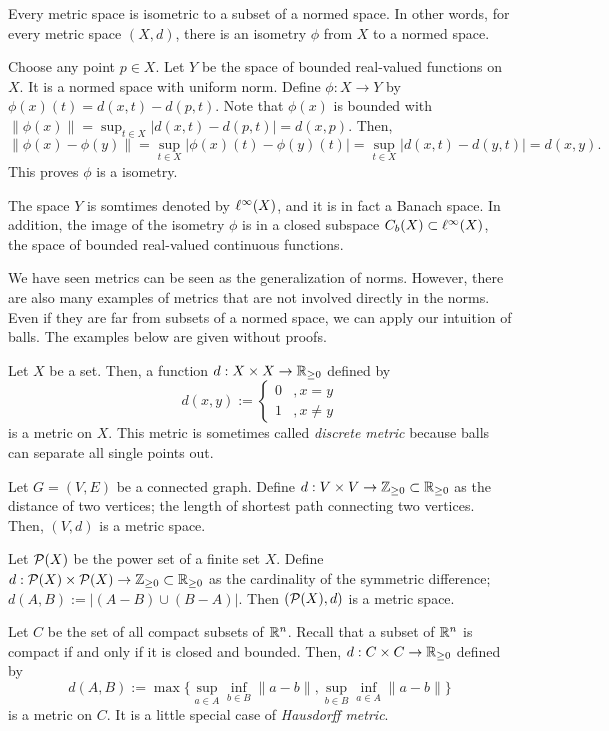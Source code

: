 \documentclass{../crs}
\begin{document}
\begin{prop}
Every metric space is isometric to a subset of a normed space.
In other words, for every metric space $(X,d)$, there is an isometry $\phi$ from $X$ to a normed space.
\end{prop}
\begin{pf}
Choose any point $p\in X$.
Let $Y$ be the space of bounded real-valued functions on $X$.
It is a normed space with uniform norm.
Define $\phi:X\to Y$ by $\phi(x)(t)=d(x,t)-d(p,t)$.
Note that $\phi(x)$ is bounded with $\|\phi(x)\|=\sup_{t\in X}|d(x,t)-d(p,t)|=d(x,p)$.
Then,
\[\|\phi(x)-\phi(y)\|=\sup_{t\in X}|\phi(x)(t)-\phi(y)(t)|=\sup_{t\in X}|d(x,t)-d(y,t)|=d(x,y).\]
This proves $\phi$ is a isometry.
\end{pf}
\begin{rmk}
The space $Y$ is somtimes denoted by $\ell^\infty(X)$, and it is in fact a Banach space.
In addition, the image of the isometry $\phi$ is in a closed subspace $C_b(X)\subset\ell^\infty(X)$, the space of bounded real-valued continuous functions.
\end{rmk}

We have seen metrics can be seen as the generalization of norms.
However, there are also many examples of metrics that are not involved directly in the norms.
Even if they are far from subsets of a normed space, we can apply our intuition of balls.
The examples below are given without proofs.

\begin{ex}\label{ex:discrete metric}
Let $X$ be a set.
Then, a function $d:X\x X\to\R_{\ge0}$ defined by
\[d(x,y):=\begin{cases}0&,x=y\\1&,x\ne y\end{cases}\]
is a metric on $X$.
This metric is sometimes called \emph{discrete metric} because balls can separate all single points out.
\end{ex}
\begin{ex}
Let $G=(V,E)$ be a connected graph.
Define $d:V\x V\to\Z_{\ge0}\subset\R_{\ge0}$ as the distance of two vertices; the length of shortest path connecting two vertices.
Then, $(V,d)$ is a metric space.
\end{ex}
\begin{ex}
Let $\mathcal{P}(X)$ be the power set of a finite set $X$.
Define $d:\cP(X)\x\cP(X)\to\Z_{\ge0}\subset\R_{\ge0}$ as the cardinality of the symmetric difference; $d(A,B):=|(A-B)\cup(B-A)|$.
Then $(\mathcal{P}(X),d)$ is a metric space.
\end{ex}
\begin{ex}
Let $C$ be the set of all compact subsets of $\mathbb{R}^n$.
Recall that a subset of $\mathbb{R}^n$ is compact if and only if it is closed and bounded.
Then, $d:C\x C\to\R_{\ge0}$ defined by
\[d(A,B):=\max\{\sup_{a\in A}\inf_{b\in B}\|a-b\|,\sup_{b\in B}\inf_{a\in A}\|a-b\|\}\]
is a metric on $C$.
It is a little special case of \emph{Hausdorff metric}.
\end{ex}
\end{document}
